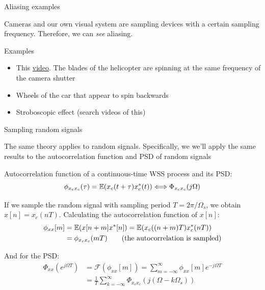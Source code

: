 \documentclass[10pt]{beamer}
\begin{document}
%
\begin{frame}{Aliasing examples}

Cameras and our own visual system are sampling devices with a certain sampling frequency. Therefore, we can \textit{see} aliasing.

\begin{block}{Examples}
	\begin{itemize}
		\item This \href{https://www.youtube.com/watch?v=R-IVw8OKjvQ}{video}. 		
		The blades of the helicopter are spinning at the same frequency of the camera shutter
		\item Wheels of the car that appear to spin backwards
		\item Stroboscopic effect (search videos of this)
	\end{itemize}
\end{block}
\end{frame}

%
\begin{frame}{Sampling random signals}

The same theory applies to random signals. Specifically, we we'll apply the same results to the autocorrelation function and PSD of random signals

Autocorrelation function of a continuous-time WSS process and its PSD:
\begin{equation*}
\phi_{x_cx_c}(\tau) = \operatorname{\mathbb{E}}(x_c(t+\tau)x_c^*(t)) \Longleftrightarrow \Phi_{x_cx_c}(j\Omega)
\end{equation*}

If we sample the random signal with sampling period $T = 2\pi/\Omega_s$, we obtain $x[n] = x_c(nT)$. Calculating the autocorrelation function of $x[n]$:
\begin{align*}
\phi_{xx}[m] &= \operatorname{\mathbb{E}}(x[n+m]x^*[n]) = \operatorname{\mathbb{E}}(x_c((n+m)T)x_c^*(nT)) \\
&= \phi_{x_cx_c}(mT) \tag{the autocorrelation is sampled}
\end{align*}

And for the PSD:
\begin{align*}
\Phi_{xx}(e^{j\Omega T}) &= \mathcal{F}(\phi_{xx}[m]) = \sum_{m=-\infty}^{\infty}\phi_{xx}[m]e^{-j\Omega T} \\
&= \frac{1}{T}\sum_{k=-\infty}^{\infty}\Phi_{x_cx_c}(j(\Omega-k\Omega_s)) \tag{the PSD is replicated with period $\Omega_s$}
\end{align*}

\end{frame}
\end{document}
